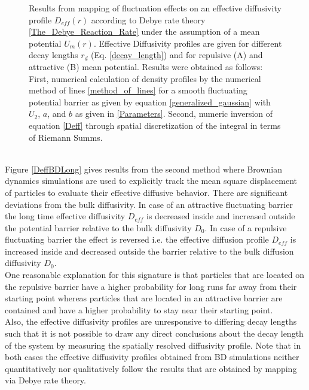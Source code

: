 \begin{minipage}[t]{.37 \textwidth}
    \begin{figure}[H]
        \caption{Results from mapping of fluctuation effects on an effective diffusivity profile $D_{eff}(r)$ according to Debye rate theory \ref{The_Debye_Reaction_Rate} under the assumption of a mean potential $U_m(r)$. Effective Diffusivity profiles are given for different decay lengths $r_d$ (Eq. \eqref{decay_length}) and for repulsive (A) and attractive (B) mean potential. Results were obtained as follows: First, numerical calculation of density profiles by the numerical method of lines \ref{method_of_lines} for a smooth fluctuating potential barrier as given by equation \eqref{generalized_gaussian} with $U_2$, $a$, and $b$ as given in \eqref{Parameters}. Second, numeric inversion of equation \eqref{Deff} through spatial discretization of the integral in terms of Riemann Summs.   \label{DeffMOL}}
    \end{figure}
  \end{minipage}
\vspace{0.3 cm}\\
Figure \ref{DeffBDLong} gives results from the second method where Brownian dynamics simulations are used to explicitly track the mean square displacement of particles to evaluate their effective diffusive behavior.
There are significant deviations from the bulk diffusivity. In case of an attractive fluctuating barrier the long time effective diffusivity $D_{eff}$ is decreased inside and increased outside the potential barrier relative to the  bulk diffusivity $D_0$. In case of a repulsive fluctuating barrier the effect is reversed i.e. the effective diffusion profile $D_{eff}$ is increased inside and decreased outside the barrier relative to the bulk diffusion diffusivity $D_0$. \\
One reasonable explanation for this signature is that particles that are located on the repulsive barrier have a higher probability for long runs far away from their starting point whereas particles that are located in an attractive barrier are contained and have a higher probability to stay near their starting point.\\ 
Also, the effective diffusivity profiles are unresponsive to differing decay lengths such that it is not possible to draw any direct conclusions about the decay length of the system by measuring the spatially resolved diffusivity profile.
Note that in both cases the effective diffusivity profiles obtained from BD simulations neither quantitatively nor qualitatively follow the results that are obtained by mapping via Debye rate theory.
